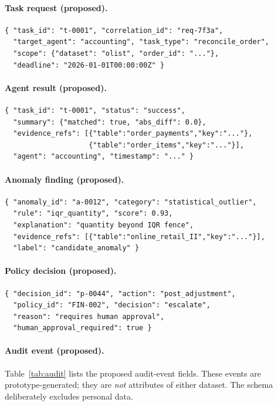 \documentclass[11pt,a4paper]{article}
\begin{document}
\paragraph{Task request (proposed).}
\begin{verbatim}
{ "task_id": "t-0001", "correlation_id": "req-7f3a",
  "target_agent": "accounting", "task_type": "reconcile_order",
  "scope": {"dataset": "olist", "order_id": "..."},
  "deadline": "2026-01-01T00:00:00Z" }
\end{verbatim}

\paragraph{Agent result (proposed).}
\begin{verbatim}
{ "task_id": "t-0001", "status": "success",
  "summary": {"matched": true, "abs_diff": 0.0},
  "evidence_refs": [{"table":"order_payments","key":"..."},
                    {"table":"order_items","key":"..."}],
  "agent": "accounting", "timestamp": "..." }
\end{verbatim}

\paragraph{Anomaly finding (proposed).}
\begin{verbatim}
{ "anomaly_id": "a-0012", "category": "statistical_outlier",
  "rule": "iqr_quantity", "score": 0.93,
  "explanation": "quantity beyond IQR fence",
  "evidence_refs": [{"table":"online_retail_II","key":"..."}],
  "label": "candidate_anomaly" }
\end{verbatim}

\paragraph{Policy decision (proposed).}
\begin{verbatim}
{ "decision_id": "p-0044", "action": "post_adjustment",
  "policy_id": "FIN-002", "decision": "escalate",
  "reason": "requires human approval",
  "human_approval_required": true }
\end{verbatim}

\paragraph{Audit event (proposed).} Table~\ref{tab:audit} lists the proposed audit-event fields. These events are prototype-generated; they are \emph{not} attributes of either dataset. The schema deliberately excludes personal data.
\end{document}
